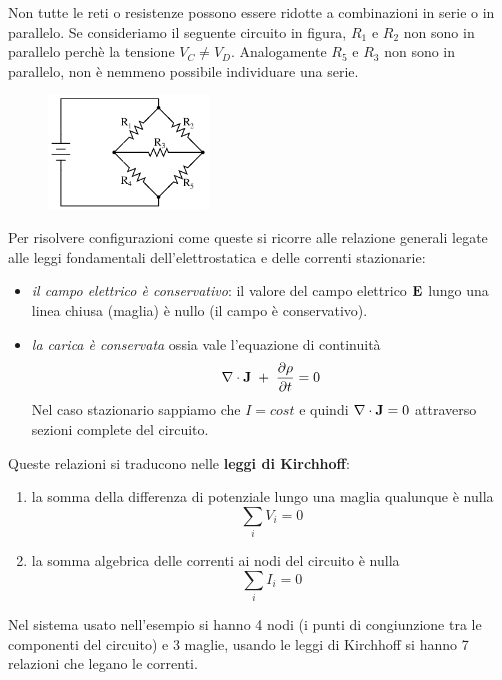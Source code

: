  Non tutte le reti o resistenze possono essere ridotte a combinazioni in serie o in parallelo. Se consideriamo il seguente circuito in figura, $R_{1}$ e $R_{2}$ non sono in parallelo perch\`e la tensione $V_{C} \neq V_{D}$. Analogamente $R_{5}$ e $R_{3}$ non sono in parallelo, non \`e nemmeno possibile individuare una serie.
 
 \begin{figure}
  \centering
  \includegraphics[width=0.38\textwidth]{images/kirch}
\end{figure}
 Per risolvere configurazioni come queste si ricorre alle relazione generali legate alle leggi fondamentali dell'elettrostatica e delle correnti stazionarie:
\begin{itemize}
	\item \textit{il campo elettrico \`e conservativo}: il valore del campo elettrico $\bold{E}$ lungo una linea chiusa (maglia) \`e nullo (il campo \`e conservativo).
	\item \textit{la carica \`e conservata} ossia vale l'equazione di continuit\`a 
	\begin{equation*}
		\nabla \cdot \bold{J} \; + \; \frac{\partial \rho}{\partial t} = 0
	\end{equation*}
	Nel caso stazionario sappiamo che $I = cost $ e quindi $\nabla \cdot \bold{J} = 0$ attraverso sezioni complete del circuito.
\end{itemize}
Queste relazioni si traducono nelle \textbf{leggi di Kirchhoff}:
\begin{enumerate}
	\item la somma della differenza di potenziale lungo una maglia qualunque \`e nulla 
	\begin{equation*}
		\sum_{i} V_i = 0
	\end{equation*}
	\item la somma algebrica delle correnti ai nodi del circuito \`e nulla 
	\begin{equation*}
		\sum_{i} I_{i} = 0
	\end{equation*}
\end{enumerate}
Nel sistema usato nell'esempio si hanno 4 nodi (i punti di congiunzione tra le componenti del circuito) e 3 maglie, usando le leggi di Kirchhoff si hanno 7 relazioni che legano le correnti.

